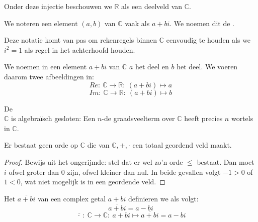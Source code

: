 \documentclass[main.tex]{subfiles}
\begin{document}
\begin{opm}
  Onder deze injectie beschouwen we $\mathbb{R}$ als een deelveld van $\mathbb{C}$.
\end{opm}

\begin{de}
  We noteren een element $(a,b)$ van $\mathbb{C}$ vaak als $a+bi$.
  We noemen dit de .
\end{de}

\begin{opm}
  Deze notatie komt van pas om rekenregels binnen $\mathbb{C}$ eenvoudig te houden als we $i^{2}=1$ als regel in het achterhoofd houden. 
\end{opm}

\begin{de}
  We noemen in een element $a+bi$ van $\mathbb{C}$ $a$ het  deel en $b$ het  deel.
  We voeren daarom twee afbeeldingen in:
  \[ Re:\ \mathbb{C} \rightarrow \mathbb{R}:\ (a+bi) \mapsto a \]
  \[ Im:\ \mathbb{C} \rightarrow \mathbb{R}:\ (a+bi) \mapsto b \]
\end{de}

\begin{st}
  De \\
  $\mathbb{C}$ is algebra\"isch gesloten: Een $n$-de graadsveelterm over $\mathbb{C}$ heeft precies $n$ wortels in $\mathbb{C}$.
  \zb
\end{st}

\begin{pr}
  Er bestaat geen orde op $\mathbb{C}$ die van $\mathbb{C},+,\cdot$ een totaal geordend veld maakt.

  \begin{proof}
    Bewijs uit het ongerijmde: stel dat er wel zo'n orde $\le$ bestaat.
    Dan moet $i$ ofwel groter dan $0$ zijn, ofwel kleiner dan nul.
    In beide gevallen volgt $-1 > 0$ of $1 < 0$, wat niet mogelijk is in een geordende veld.
  \end{proof}
\end{pr}

\begin{de}
  Het  $\overline{a+bi}$ van een complex getal $a+bi$ definieren we als volgt:
  \[ \overline{a+bi} = a-bi \]
  \[ \overline{\, \cdot\ }:\ \mathbb{C} \rightarrow \mathbb{C}:\ a+bi \mapsto \overline{a+bi} = a-bi \]
\end{de}
\end{document}
